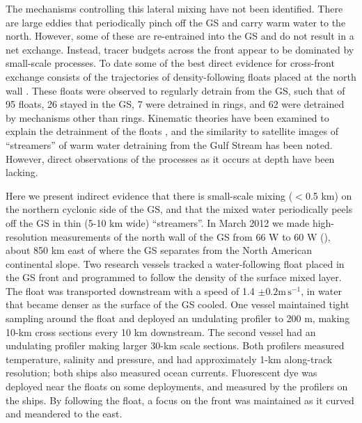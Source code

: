 \documentclass{article}
\begin{document}
The mechanisms controlling this lateral mixing have not been identified. There are large eddies that periodically pinch off the GS and carry warm water to the north. However, some of these are re-entrained into the GS and do not result in a net exchange. Instead, tracer budgets across the front appear to be dominated by small-scale processes\cite{boweretal85}. To date some of the best direct evidence for cross-front exchange consists of the trajectories of density-following floats placed at the north wall \cite{bowerrossby89,bowerlozier94}.  These floats were observed to regularly detrain from the GS, such that of 95 floats, 26 stayed in the GS, 7 were detrained in rings, and 62 were detrained by mechanisms other than rings\cite{bowerlozier94}.  Kinematic theories have been examined to explain the detrainment of the floats \cite{flierletal87,stern85,prattetal95}, and the similarity to satellite images of ``streamers'' of warm water detraining from the Gulf Stream has been noted.  However, direct observations of the  processes as it occurs at depth have been lacking.  


Here we present indirect evidence that there is small-scale mixing ($<$0.5 km) on the northern cyclonic side of the GS, and that the mixed water periodically peels off the GS in thin (5-10 km wide) ``streamers''.  In March 2012 we made high-resolution measurements of the north wall of the GS from 66 W to 60 W (), about 850 km east of where the GS separates from the North American continental slope.  Two research vessels tracked a water-following float placed in the GS front and programmed to follow the density of the surface mixed layer. The float was transported downstream with a speed of 1.4 $\pm 0.2 \mathrm{m\,s^{-1}}$, in water that became denser  as the surface of the GS cooled.  One vessel maintained tight sampling around the float and deployed an undulating profiler to 200 m, making 10-km cross sections every 10 km downstream.  The second vessel  had an undulating profiler making larger 30-km  scale sections.  Both profilers measured temperature, salinity and pressure, and had approximately 1-km along-track resolution; both ships also measured ocean currents.  Fluorescent dye was deployed near the floats on some deployments, and measured by the profilers on the ships. By following the float, a focus on the front was maintained as it curved and meandered to the east.  
\end{document}
